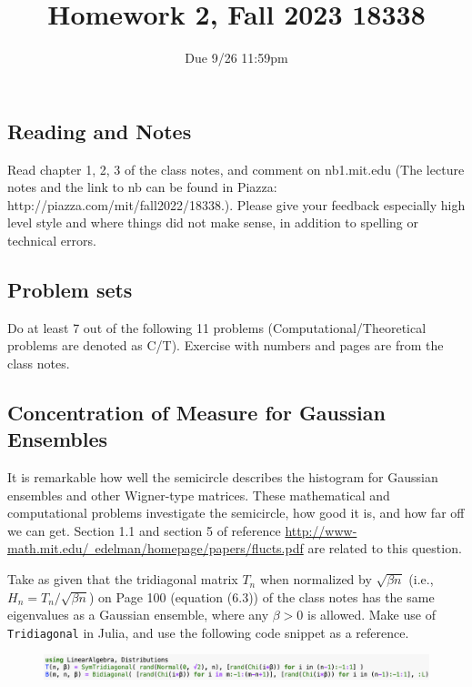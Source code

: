 \documentclass{article}
\title{Homework 2, Fall 2023 18338}
\author{Due 9/26 11:59pm}
\date{}
\begin{document}
\maketitle



\subsection*{Reading and Notes}

Read chapter 1, 2, 3 of the class notes, and comment on nb1.mit.edu (The lecture notes and the link to nb can be found in Piazza: http://piazza.com/mit/fall2022/18338.). Please give your feedback especially high level style and where things did not make sense, in addition to spelling or technical errors.

\subsection*{Problem sets}
Do at least 7 out of the following 11 problems (Computational/Theoretical problems are denoted as C/T). Exercise with numbers and pages are from the class notes.

\subsection*{Concentration of Measure for Gaussian Ensembles}

It is remarkable how well the semicircle describes the histogram for Gaussian ensembles and other Wigner-type matrices. These mathematical and computational problems investigate the semicircle, how good it is, and how far off we can get. Section 1.1 and section 5 of reference \href{http://www-math.mit.edu/~edelman/homepage/papers/flucts.pdf}{http://www-math.mit.edu/~edelman/homepage/papers/flucts.pdf} are related to this question.

Take as given that the tridiagonal matrix $T_n$ when normalized by $\sqrt{\beta n}$ (i.e., $H_n = T_n/\sqrt{\beta n}$) on Page 100 (equation (6.3)) of the class notes has the same eigenvalues as a Gaussian ensemble, where any $\beta>0$ is allowed. Make use of \verb|Tridiagonal| in Julia, and use the following code snippet as a reference.

\begin{figure}[h]
    \centering
    \includegraphics[width=6in]{code1.png}
\end{figure}
\end{document}
